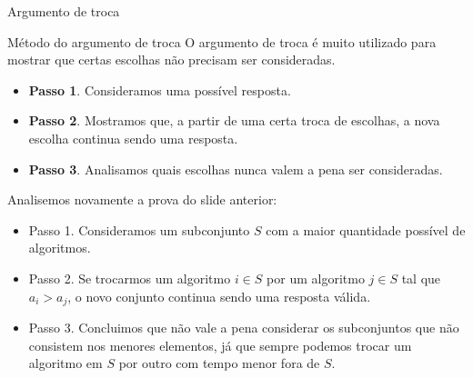 \begin{frame}{Argumento de troca}

    \begin{block}{Método do argumento de troca}
        O argumento de troca é muito utilizado para mostrar que certas escolhas não precisam ser consideradas. \pause
        \footnotesize
        \begin{itemize}
            \item {\bf Passo 1}. Consideramos uma possível resposta. \pause
            \item {\bf Passo 2}. Mostramos que, a partir de uma certa troca de escolhas, a nova escolha continua sendo uma resposta. \pause
            \item {\bf Passo 3}. Analisamos quais escolhas nunca valem a pena ser consideradas.
        \end{itemize}
    \end{block} \pause
    \footnotesize
    Analisemos novamente a prova do slide anterior: \pause
    \begin{itemize}
        \item Passo 1. Consideramos um subconjunto $S$ com a maior quantidade possível de algoritmos. \pause
        \item Passo 2. Se trocarmos um algoritmo $i \in S$ por um algoritmo $j \in S$ tal que $a_i > a_j$, o novo conjunto continua sendo uma resposta válida. \pause
        \item Passo 3. Concluimos que não vale a pena considerar os subconjuntos que não consistem nos menores elementos, já que sempre podemos trocar um algoritmo em $S$ por outro com tempo menor fora de $S$.
    \end{itemize}

\end{frame}

